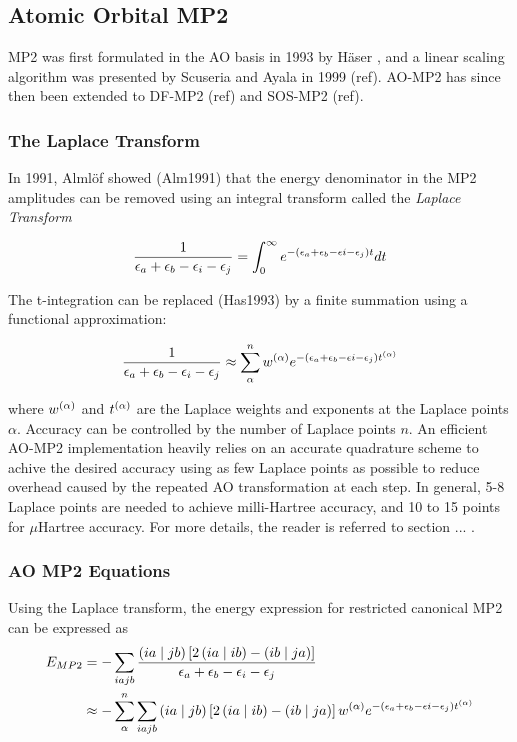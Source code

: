 \subsection{Atomic Orbital MP2}

MP2 was first formulated in the AO basis in 1993 by Häser , and a linear scaling algorithm was presented by Scuseria and Ayala in 1999 (ref). AO-MP2 has since then been extended to DF-MP2 (ref) and SOS-MP2 (ref). 

\subsubsection{The Laplace Transform}

In 1991, Almlöf showed (Alm1991) that the energy denominator in the MP2 amplitudes can be removed using an integral transform called the \emph{Laplace Transform}

\begin{equation}
\frac{1}{\epsilon_a + \epsilon_b - \epsilon_i - \epsilon_j} = \int_0^{\infty} e^{-\left(\epsilon_a + \epsilon_b - \epsilon i - \epsilon_j\right)t} dt
\end{equation}

The t-integration can be replaced (Has1993) by a finite summation using a functional approximation:

\begin{equation}
\frac{1}{\epsilon_a + \epsilon_b - \epsilon_i - \epsilon_j} \approx \sum_{\alpha}^{n} w^{(\alpha)} e^{-\left(\epsilon_a + \epsilon_b - \epsilon i - \epsilon_j\right)t^{(\alpha)}}
\end{equation} 

\noindent where $w^{(\alpha)}$ and $t^{(\alpha)}$ are the Laplace weights and exponents at the Laplace points $\alpha$. Accuracy can be controlled by the number of Laplace points $n$. An efficient AO-MP2 implementation heavily relies on an accurate quadrature scheme to achive the desired accuracy using as few Laplace points as possible to reduce overhead caused by the repeated AO transformation at each step. In general, 5-8 Laplace points are needed to achieve milli-Hartree accuracy, and 10 to 15 points for $\mu$Hartree accuracy. For more details, the reader is referred to section ... .

\subsubsection{AO MP2 Equations}

Using the Laplace transform, the energy expression for restricted canonical MP2 can be expressed as
\begin{equation}
\begin{split}
E_{MP2} &= - \sum_{iajb} \frac{\left( ia \mid jb \right) \left[2 \left( ia \mid ib \right) - \left( ib \mid ja \right) \right]}{\epsilon_a + \epsilon_b - \epsilon_i - \epsilon_j} \\
&\approx - \sum_{\alpha}^n \sum_{iajb} \left( ia \mid jb \right) \left[2 \left( ia \mid ib \right) - \left( ib \mid ja \right) \right] w^{(\alpha)} e^{-\left(\epsilon_a + \epsilon_b - \epsilon i - \epsilon_j\right)t^{(\alpha)}}
\end{split}
\end{equation}

